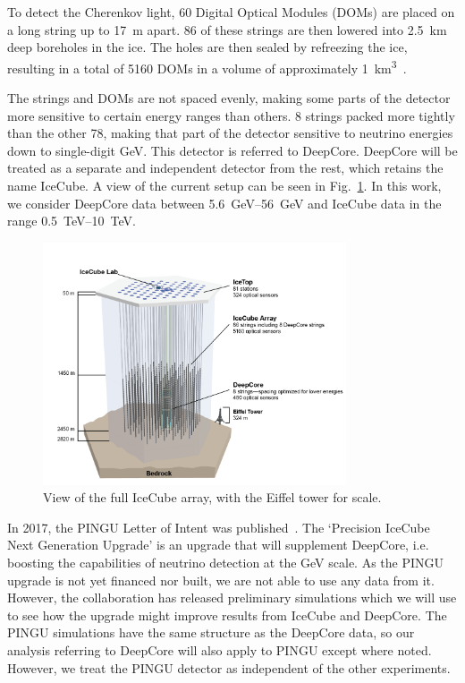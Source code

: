 To detect the Cherenkov light, 60 Digital Optical Modules (DOMs) are placed on a long string up to \SI{17}{\metre} apart. 86 of these strings are then lowered
into \SI{2.5}{\km} deep boreholes in the ice. The holes are then sealed by refreezing the ice, resulting in a total of 5160 DOMs in a volume of approximately \SI{1}{\km^3}~\cite{weaverThesis}.

The strings and DOMs are not spaced evenly, making some parts of the detector more sensitive to certain energy ranges than others.
8 strings packed more tightly than the other 78, making that part of the detector sensitive to neutrino energies down to single-digit \si{\GeV}. This detector is referred to DeepCore. DeepCore will be treated as a separate and independent detector from the rest, which
retains the name IceCube. A view of the current setup can be seen in Fig.~\ref{fig:array}. In this work, we consider DeepCore data between \SIrange{5.6}{56}{\GeV} and IceCube data in the range \SIrange{0.5}{10}{\TeV}.
\begin{figure}
    \centering
    \includegraphics[width=0.8\textwidth]{figures/icecube2.png}
    \caption{View of the full IceCube array, with the Eiffel tower for scale.}\label{fig:array}
\end{figure}

In 2017, the PINGU Letter of Intent was published~\cite{PINGUletter}. The `Precision IceCube Next Generation Upgrade' is an upgrade that will 
supplement DeepCore, i.e. boosting the capabilities of neutrino detection at the \si{\GeV} scale. As the PINGU upgrade is not yet financed nor built, we are
not able to use any data from it. However, the collaboration has released preliminary simulations which we will use to see how the upgrade might improve
results from IceCube and DeepCore. The PINGU simulations have the same structure as the DeepCore data, so our analysis referring to DeepCore will
also apply to PINGU except where noted. However, we treat the PINGU detector as independent of the other experiments.

